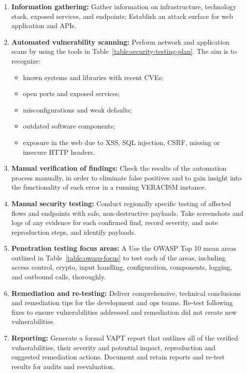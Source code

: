 \begin{enumerate}
  \item \textbf{Information gathering:}  
        Gather information on infrastructure, technology stack, exposed services, and endpoints; Establish an attack surface for web application and APIs.

  \item \textbf{Automated vulnerability scanning:}  
           Perform network and application scans by using the tools in
        Table~\ref{table:security-testing-plan}. The aim is to recognize:
        \begin{itemize}
          \item known systems and libraries with recent CVEs;
          \item open ports and exposed services;
          \item misconfigurations and weak defaults;
          \item outdated software components;
          \item exposure in the web due to XSS, SQL injection, CSRF, missing or insecure HTTP headers.
        \end{itemize}

  \item \textbf{Manual verification of findings:}  
        Check the results of the automation process manually, in order to eliminate false positives and to gain insight into the functionality of each error in a running VERACISM instance.

  \item \textbf{Manual security testing:}  
        Conduct regionally specific testing of affected flows and endpoints with safe, non-destructive payloads. Take screenshots and logs of any evidence for each confirmed find, record severity, and note reproduction steps, and identify payloads.

  \item \textbf{Penetration testing focus areas:}  
        A Use the OWASP Top 10 mean areas outlined in
        Table~\ref{table:owasp-focus} to test each of the areas, including access control, crypto, input handling, configuration, components, logging, and outbound calls, thoroughly.

  \item \textbf{Remediation and re-testing:}  
        Deliver comprehensive, technical conclusions and remediation tips for the development and ops teams. Re-test following fixes to ensure vulnerabilities addressed and remediation did not create new vulnerabilities.

  \item \textbf{Reporting:}  
        Generate a formal VAPT report that outlines all of the verified vulnerabilities, their severity and potential impact, reproduction and suggested remediation actions. Document and retain reports and re-test results for audits and reevaluation.
\end{enumerate}

